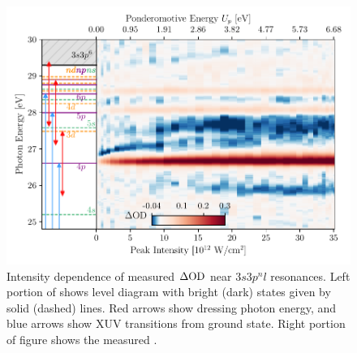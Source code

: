 \begin{figure}
	\centering
	\includegraphics[width=1.0\textwidth]{figures/ATS/dOD_HWP.pdf}
	\caption[Intensity dependence of dressed autoionizing states in Ar]{Intensity dependence of measured $\Delta\mathrm{OD}$ near $3s3p^nl$ resonances.  Left portion of shows level diagram with bright (dark) states given by solid (dashed) lines. Red arrows show dressing photon energy, and blue arrows show XUV transitions from ground state.  Right portion of figure shows the measured \dod.}
	\label{fig:dOD_HWP}
\end{figure}

